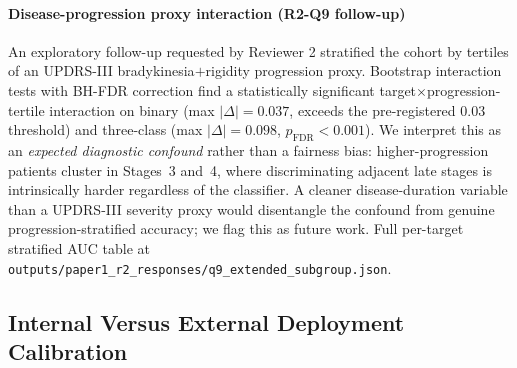 \documentclass[10pt,letterpaper]{article}
\begin{document}
\paragraph*{Disease-progression proxy interaction (R2-Q9 follow-up)} An exploratory follow-up requested by Reviewer 2 stratified the cohort by tertiles of an UPDRS-III bradykinesia$+$rigidity progression proxy. Bootstrap interaction tests with BH-FDR correction find a statistically significant target$\times$progression-tertile interaction on binary (max $|\Delta|{=}0.037$, exceeds the pre-registered $0.03$ threshold) and three-class (max $|\Delta|{=}0.098$, $p_{\text{FDR}}<0.001$). We interpret this as an \emph{expected diagnostic confound} rather than a fairness bias: higher-progression patients cluster in Stages~3 and~4, where discriminating adjacent late stages is intrinsically harder regardless of the classifier. A cleaner disease-duration variable than a UPDRS-III severity proxy would disentangle the confound from genuine progression-stratified accuracy; we flag this as future work. Full per-target stratified AUC table at \texttt{outputs/paper1\_r2\_responses/q9\_extended\_subgroup.json}.

\subsection*{Internal Versus External Deployment Calibration}
\label{p1:sec:discussion:internal-vs-external}
\end{document}
